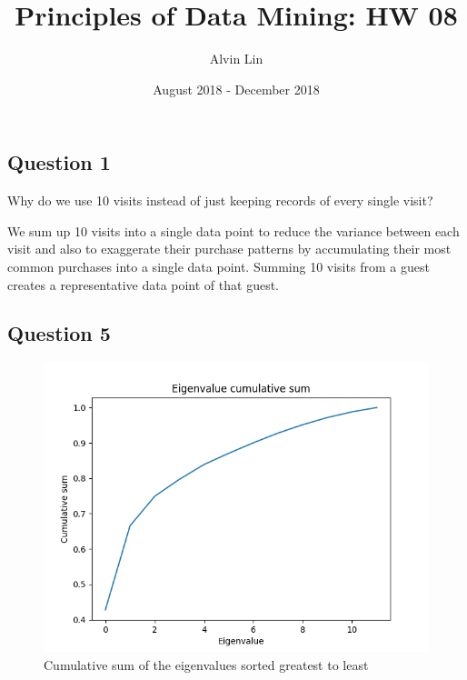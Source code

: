 \documentclass{math}
\title{Principles of Data Mining: HW 08}
\author{Alvin Lin}
\date{August 2018 - December 2018}
\begin{document}
\maketitle

\subsection*{Question 1}
Why do we use 10 visits instead of just keeping records of every single visit?
\par
We sum up 10 visits into a single data point to reduce the variance between
each visit and also to exaggerate their purchase patterns by accumulating their
most common purchases into a single data point. Summing 10 visits from a guest
creates a representative data point of that guest.

\subsection*{Question 5}
\begin{figure}[H]
  \centering
  \includegraphics[width=15cm]{assets/hw_08_eigenvalue_cumsum.png}
  \caption{Cumulative sum of the eigenvalues sorted greatest to least}
\end{figure}
\end{document}
